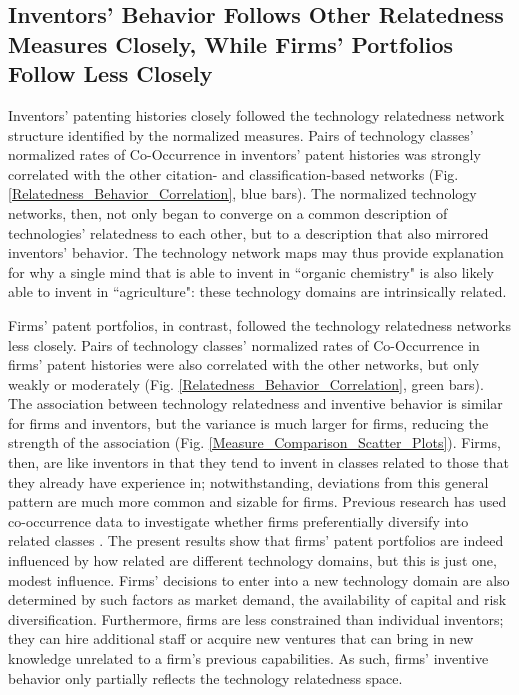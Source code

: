 \documentclass[pre,reprint,groupedaddress,superscriptaddress]{revtex4-1}
\begin{document}
\subsection{Inventors' Behavior Follows Other Relatedness Measures Closely, While Firms' Portfolios Follow Less Closely}
Inventors' patenting histories closely followed the technology relatedness network structure identified by the normalized measures. Pairs of technology classes' normalized rates of Co-Occurrence in inventors' patent histories was strongly correlated with the other citation- and classification-based networks (Fig. \ref{Relatedness_Behavior_Correlation}, blue bars). The normalized technology networks, then, not only began to converge on a common description of technologies' relatedness to each other, but to a description that also mirrored inventors' behavior. The technology network maps may thus provide explanation for why a single mind that is able to invent in ``organic chemistry" is also likely able to invent in ``agriculture": these technology domains are intrinsically related.

Firms' patent portfolios, in contrast, followed the technology relatedness networks less closely. Pairs of technology classes' normalized rates of Co-Occurrence in firms' patent histories were also correlated with the other networks, but only weakly or moderately (Fig. \ref{Relatedness_Behavior_Correlation}, green bars). The association between technology relatedness and inventive behavior is similar for firms and inventors, but the variance is much larger for firms, reducing the strength of the association (Fig. \ref{Measure_Comparison_Scatter_Plots}). Firms, then, are like inventors in that they tend to invent in classes related to those that they already have experience in; notwithstanding, deviations from this general pattern are much more common and sizable for firms. Previous research has used co-occurrence data to investigate whether firms preferentially diversify into related classes \cite{Bottazzi2010, Breschi2003, Teece1994}. The present results show that firms' patent portfolios are indeed influenced by how related are different technology domains, but this is just one, modest influence. Firms' decisions to enter into a new technology domain are also determined by such factors as market demand, the availability of capital and risk diversification. Furthermore, firms are less constrained than individual inventors; they can hire additional staff or acquire new ventures that can bring in new knowledge unrelated to a firm's previous capabilities. As such, firms' inventive behavior only partially reflects the technology relatedness space. 
\end{document}
